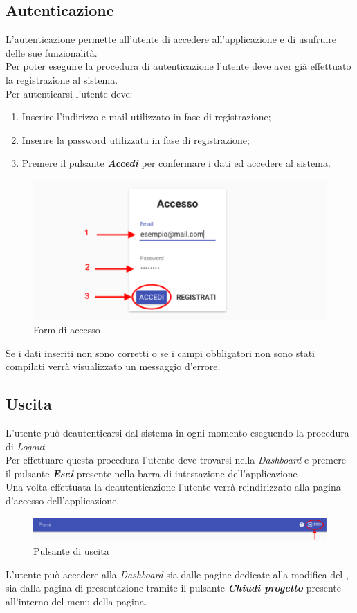 \subsection{Autenticazione}
L'autenticazione permette all'utente di accedere all'applicazione \Premi e di usufruire delle sue funzionalità.\\ Per poter eseguire la procedura di autenticazione l'utente deve aver già effettuato la registrazione al sistema.\\
Per autenticarsi l'utente deve:
\begin{enumerate}
\item Inserire l'indirizzo e-mail utilizzato in fase di registrazione;
\item Inserire la password utilizzata in fase di registrazione;
\item Premere il pulsante \textbf{\textit{Accedi}} per confermare i dati ed accedere al sistema.
\end{enumerate}
\begin{figure}[H]
\centering
\includegraphics[scale=0.5]{immagini/imgAccesso.pdf}
\caption{Form di accesso}
\end{figure}
Se i dati inseriti non sono corretti o se i campi obbligatori non sono stati compilati verrà visualizzato un messaggio d'errore.
\subsection{Uscita}
L'utente può deautenticarsi dal sistema in ogni momento eseguendo la procedura di \textit{Logout}.\\Per effettuare questa procedura l'utente deve trovarsi nella \textit{Dashboard} e premere il pulsante \textbf{\textit{Esci}} presente nella barra di intestazione dell'applicazione .\\
Una volta effettuata la deautenticazione l'utente verrà reindirizzato alla pagina d'accesso dell'applicazione.
\begin{figure}[H]
\centering
\includegraphics[scale=0.3]{immagini/imgEsci.pdf}
\caption{Pulsante di uscita}
\end{figure}
L'utente può accedere alla \textit{Dashboard} sia dalle pagine dedicate alla modifica del , sia dalla pagina di presentazione tramite il pulsante \textbf{\textit{Chiudi progetto}} presente all'interno del menu della pagina.
